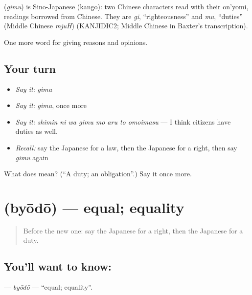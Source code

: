 \begin{cousinweb}
\textbf{} (\emph{gimu}) is Sino-Japanese (kango): two Chinese characters read with their on'yomi, readings borrowed from Chinese. They are \emph{gi}, \textquotedblleft{}righteousness\textquotedblright{} and \emph{mu}, \textquotedblleft{}duties\textquotedblright{} (Middle Chinese \emph{mjuH}) (KANJIDIC2; Middle Chinese in Baxter's transcription).
\end{cousinweb}

\begin{grammarlens}[title={What you've built}]
One more word for giving reasons and opinions.
\end{grammarlens}

\subsection*{Your turn}
\begin{itemize}
\raggedright
  \item \emph{Say it:} \emph{gimu}
  \item \emph{Say it:} \emph{gimu}, once more
  \item \emph{Say it:} \emph{shimin ni wa gimu mo aru to omoimasu} — I think citizens have duties as well.
  \item \emph{Recall:} say the Japanese for a law, then the Japanese for a right, then say \emph{gimu} again
\end{itemize}

\begin{tcolorbox}[breakable,colback=teal!4,colframe=teal!35!black,title={Before you move on}]
What does  mean? (\textquotedblleft{}A duty; an obligation\textquotedblright{}.) Say it once more.
\end{tcolorbox}
\section[\texorpdfstring{\ja{びょうどう} (byōdō)}{びょうどう (byōdō)}]{ (byōdō) — equal; equality}

\label{lesson:JA-C332-byoudou}



\begin{quote}
Before the new one: say the Japanese for a right, then the Japanese for a duty.
\end{quote}

\subsection*{You'll want to know: }
\textbf{} — \emph{byōdō} — \textquotedblleft{}equal; equality\textquotedblright{}.

